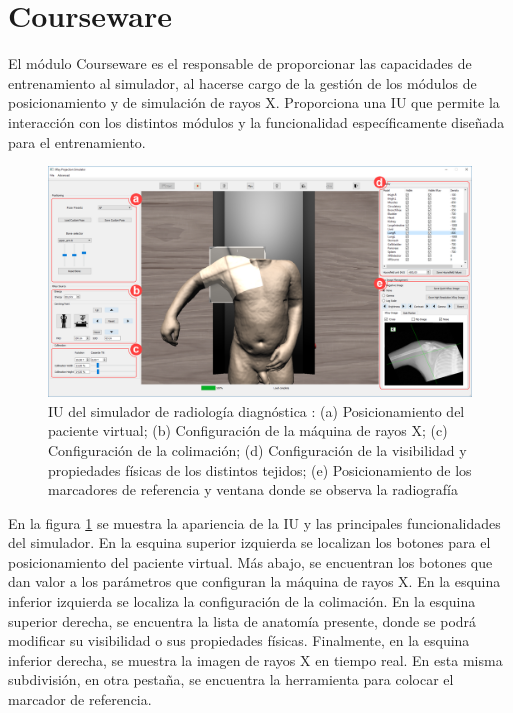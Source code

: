 



\section{Courseware}
\label{xray:courseware}

El módulo \ac{Courseware} es el responsable de proporcionar las capacidades de entrenamiento al simulador, al hacerse cargo de la gestión de los módulos de posicionamiento y de simulación de rayos X. Proporciona una \ac{IU} que permite la interacción con los distintos módulos y la funcionalidad específicamente diseñada para el entrenamiento.
\begin{figure}
    \centering
    \includegraphics[width=\linewidth]{IMG/uiteacher.png}
    \caption{\ac{IU} del simulador de radiología diagnóstica : (a) Posicionamiento del paciente virtual;  (b) Configuración de la máquina de rayos X; (c) Configuración de la colimación; (d) Configuración de la visibilidad y propiedades físicas de los distintos tejidos; (e) Posicionamiento de los marcadores de referencia y ventana donde se observa la radiografía}
    \label{fig:uiusecase}
\end{figure}

En la figura \ref{fig:uiusecase} se muestra la apariencia de la \ac{IU} y las principales funcionalidades del simulador. En la esquina superior izquierda se localizan los botones para el posicionamiento del paciente virtual. Más abajo, se encuentran los botones que dan valor a los parámetros que configuran la máquina de rayos X. En la esquina inferior izquierda se localiza la configuración de la colimación. En la esquina superior derecha, se encuentra la lista de anatomía presente, donde se podrá modificar su visibilidad o sus propiedades físicas.  Finalmente, en la esquina inferior derecha, se muestra la imagen de rayos X en tiempo real. En esta misma subdivisión, en otra pestaña, se encuentra la herramienta para colocar el marcador de referencia.

